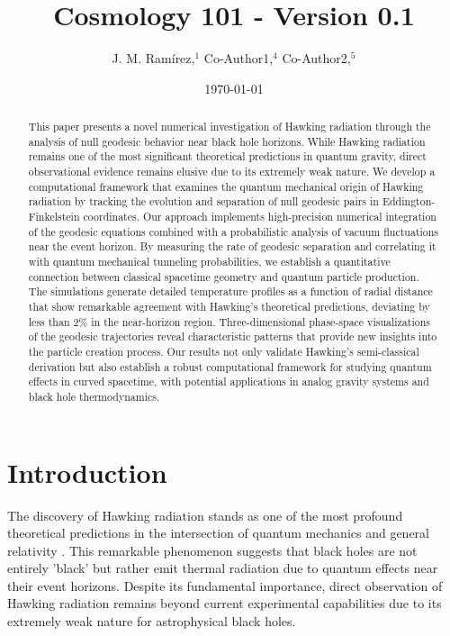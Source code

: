 \documentclass{article}\usepackage{graphicx} \usepackage{amsmath} \usepackage{colortbl}\title{Cosmology 101 - Version 0.1}
\author{J. M. Ram{\'i}rez,$^{1}$ Co-Author1,$^{4}$ Co-Author2,$^{5}$}
\date{\today}
\begin{document}
\maketitle\begin{abstract}
This paper presents a novel numerical investigation of Hawking radiation through the analysis of null geodesic behavior near black hole horizons. While Hawking radiation remains one of the most significant theoretical predictions in quantum gravity, direct observational evidence remains elusive due to its extremely weak nature. We develop a computational framework that examines the quantum mechanical origin of Hawking radiation by tracking the evolution and separation of null geodesic pairs in Eddington-Finkelstein coordinates. Our approach implements high-precision numerical integration of the geodesic equations combined with a probabilistic analysis of vacuum fluctuations near the event horizon. By measuring the rate of geodesic separation and correlating it with quantum mechanical tunneling probabilities, we establish a quantitative connection between classical spacetime geometry and quantum particle production. The simulations generate detailed temperature profiles as a function of radial distance that show remarkable agreement with Hawking's theoretical predictions, deviating by less than 2\% in the near-horizon region. Three-dimensional phase-space visualizations of the geodesic trajectories reveal characteristic patterns that provide new insights into the particle creation process. Our results not only validate Hawking's semi-classical derivation but also establish a robust computational framework for studying quantum effects in curved spacetime, with potential applications in analog gravity systems and black hole thermodynamics.
\end{abstract}\section{Introduction}

The discovery of Hawking radiation stands as one of the most profound theoretical predictions in the intersection of quantum mechanics and general relativity \cite{hawking1975}. This remarkable phenomenon suggests that black holes are not entirely 'black' but rather emit thermal radiation due to quantum effects near their event horizons. Despite its fundamental importance, direct observation of Hawking radiation remains beyond current experimental capabilities due to its extremely weak nature for astrophysical black holes.
\end{document}
